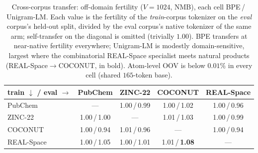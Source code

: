 \begin{table}[htbp]
  \centering
  \caption{Cross-corpus transfer: off-domain fertility ($V{=}1024$, NMB), each cell BPE\,/\,Unigram-LM. Each value is the fertility of the \emph{train}-corpus tokenizer on the \emph{eval} corpus's held-out split, divided by the eval corpus's native tokenizer of the same arm; self-transfer on the diagonal is omitted (trivially $1.00$). BPE transfers at near-native fertility everywhere; Unigram-LM is modestly domain-sensitive, largest where the combinatorial REAL-Space specialist meets natural products (REAL-Space$\to$COCONUT, in bold). Atom-level OOV is below $0.01\%$ in every cell (shared $165$-token base).}
  \label{tab:transfer}
  \small
  \begin{tabular}{@{}l cccc@{}}
    \toprule
    train $\downarrow$ / eval $\rightarrow$ & PubChem & ZINC-22 & COCONUT & REAL-Space \\
    \midrule
    PubChem & --- & 1.00\,/\,0.99 & 1.00\,/\,1.02 & 1.00\,/\,0.96 \\
    ZINC-22 & 1.00\,/\,1.00 & --- & 1.01\,/\,1.03 & 1.00\,/\,0.99 \\
    COCONUT & 1.00\,/\,0.94 & 1.01\,/\,0.96 & --- & 1.00\,/\,0.94 \\
    REAL-Space & 1.00\,/\,1.05 & 1.00\,/\,1.01 & 1.01\,/\,\textbf{1.08} & --- \\
    \bottomrule
  \end{tabular}
\end{table}
